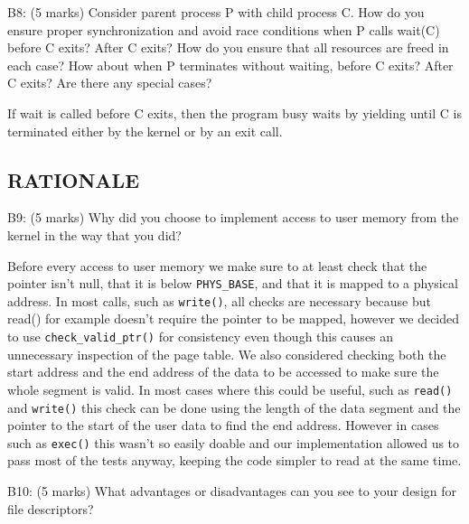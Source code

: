 \noindent B8: (5 marks)
Consider parent process P with child process C.  How do you
ensure proper synchronization and avoid race conditions when P
calls wait(C) before C exits?  After C exits?  How do you ensure
that all resources are freed in each case?  How about when P
terminates without waiting, before C exits?  After C exits?  Are
there any special cases?


If wait is called before C exits, then the program busy waits by yielding until C is terminated either by the kernel or by an exit call.



\subsection*{RATIONALE}

\noindent B9: (5 marks)
Why did you choose to implement access to user memory from the
kernel in the way that you did?


Before every access to user memory we make sure to at least check that the pointer isn't null, that it is below \texttt{PHYS\_BASE}, and  that it is mapped to a physical address.
In most calls, such as \texttt{write()}, all checks are necessary because
but read() for example doesn't require the pointer to be mapped, however we decided to use \texttt{check\_valid\_ptr()} for consistency even though this causes an unnecessary inspection of the page table.
We also considered checking both the start address and the end address of the data to be accessed to make sure the whole segment is valid.
In most cases where this could be useful, such as \texttt{read()} and \texttt{write()} this check can be done using the length of the data segment and the pointer to the start of the user data to find the end address. However in cases such as \texttt{exec()} this wasn't so easily doable and our implementation allowed us to pass most of the tests anyway, keeping the code simpler to read at the same time. 



\noindent B10: (5 marks)
What advantages or disadvantages can you see to your design
for file descriptors?

